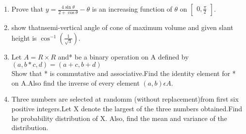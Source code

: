 \documentclass[12pt,-letter paper]{article}
\providecommand{\myvec}[1]{\ensuremath{\begin{bmatrix}#1\end{bmatrix}}}
\providecommand{\brak}[1]{\ensuremath{\left(#1\right)}}
\begin{document}
\begin{enumerate}
  \item Prove that $y=\frac{4\sin{\theta}}{2+\cos{\theta}}-\theta$ is an increasing function of $\theta$ on  $\myvec{0,\frac{\pi}{2}}$.

  \item  show thatnsemi-vertical angle of cone of maximum volume and given slant height is  $\cos^{-1}(\frac{1}{\sqrt{3}})$.
     
  \item Let $A=R\times R$ and* be a binary operation on A defined by\\ $\brak{{a,b}*{c,d}}=\brak{a+c,b+d}$\\
	  Show that * is commutative and associative.Find the identity element for * on A.Also find the inverse of every element $\brak{a,b}\epsilon A$.

 
   \item Three numbers are selected at randomm (without replacement)from first six positive integers.Let X denote the largest of the three numbers obtained.Find he probability distribution of X. Also, find the mean and variance of the distribution.

\end{enumerate}        
\end{document}
